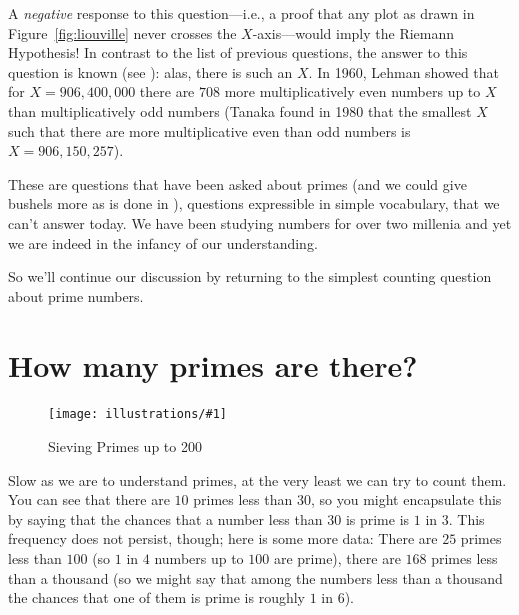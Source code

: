 \documentclass[openany]{book}
\newcommand{\ill}[3]{%
   \begin{figure}[H]%
   \vspace{-2ex}
   \centering%
   \texttt{[image: illustrations/\#1]}%
   \caption{#3}%
   \vspace{-2ex}
    \end{figure}}
\theoremstyle{plain}
\theoremstyle{definition}
\begin{document}
A {\em negative} response to this question---i.e., a proof that any
plot as drawn in Figure~\ref{fig:liouville} never crosses
the $X$-axis---would imply the Riemann Hypothesis!  In contrast to the list of
previous questions, the answer to this question is known (see ): alas, there is such an $X$.  In 1960, Lehman showed that
for $X=906,400,000$ there are $708$ more multiplicatively even numbers
up to $X$ than multiplicatively odd numbers (Tanaka found in 1980 that
the smallest $X$ such that there are more multiplicative even than odd
numbers is $X=906,150,257$).

These are questions that have been asked about primes (and we could
give bushels more as is done in ),
questions expressible in simple vocabulary, that
we can't answer today. We have been studying numbers for over two
millenia and yet we are indeed in the infancy of our understanding.


So we'll continue our discussion by returning to the simplest counting
question about prime numbers.

\chapter{How many primes are there?}

\ill{sieve200}{.8}{Sieving Primes up to 200}

Slow as we are to understand primes, at the very least we can try to
count them. You can see that there are $10$ primes less than $30$, so
you might encapsulate this by saying that the chances that a number
less than $30$ is prime is $1$ in $3$.  This frequency does not
persist, though; here is some more data: There are $25$ primes less
than $100$ (so $1$ in $4$ numbers up to $100$ are prime), there are
$168$ primes less than a thousand (so we might say that among the
numbers less than a thousand the chances that one of them is prime is
roughly $1$ in $6$).
\end{document}
